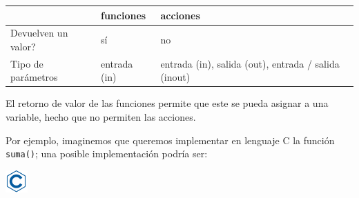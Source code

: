 \documentclass[
]{book}
\begin{document}
\begin{longtable}[]{@{}lll@{}}
\toprule
\begin{minipage}[b]{0.50\columnwidth}\raggedright
\strut
\end{minipage} & \begin{minipage}[b]{0.22\columnwidth}\raggedright
funciones\strut
\end{minipage} & \begin{minipage}[b]{0.19\columnwidth}\raggedright
acciones\strut
\end{minipage}\tabularnewline
\midrule
\endhead
\begin{minipage}[t]{0.50\columnwidth}\raggedright
Devuelven un valor?\strut
\end{minipage} & \begin{minipage}[t]{0.22\columnwidth}\raggedright
sí\strut
\end{minipage} & \begin{minipage}[t]{0.19\columnwidth}\raggedright
no\strut
\end{minipage}\tabularnewline
\begin{minipage}[t]{0.50\columnwidth}\raggedright
Tipo de parámetros\strut
\end{minipage} & \begin{minipage}[t]{0.22\columnwidth}\raggedright
entrada (in)\strut
\end{minipage} & \begin{minipage}[t]{0.19\columnwidth}\raggedright
entrada (in), salida (out), entrada / salida (inout)\strut
\end{minipage}\tabularnewline
\bottomrule
\end{longtable}

El retorno de valor de las funciones permite que este se pueda asignar a una variable, hecho que no permiten las acciones.

Por ejemplo, imaginemos que queremos implementar en lenguaje C la función \texttt{suma()}; una posible implementación podría ser:

\includegraphics{./img/c.png}
\end{document}

